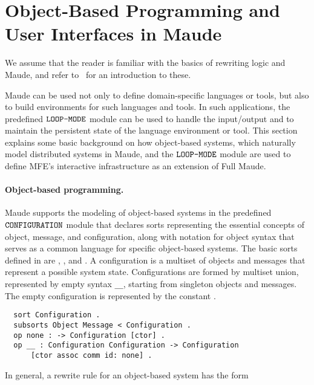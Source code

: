 \section{Object-Based Programming and User Interfaces in Maude}
\label{sec.prelim}

We assume that the reader is familiar with the basics of rewriting
logic and Maude, and refer to~\cite{CDELMMT:2007-book} for 
an introduction to these.

Maude can be used not only to define domain-specific languages
or tools, but also to build environments for such languages and tools.
In such applications, the predefined $\text{\tt LOOP-MODE}$ module can 
be used to handle
the input/output and to maintain the persistent state of the language
environment or tool. This section explains some basic background on how
object-based systems, which naturally model distributed systems in Maude,
and the $\text{\tt LOOP-MODE}$ module are used to define MFE's 
interactive infrastructure as an extension of Full Maude.

\paragraph{\bf Object-based programming.}
Maude supports the modeling of object-based systems in the
predefined $\text{\tt CONFIGURATION}$ module that declares sorts
representing the essential concepts of object, message, and
configuration, along with notation for object syntax that serves
as a common language for specific object-based systems. 
The basic sorts defined in  are ,
, and . A configuration is
a multiset of objects and messages that represent a possible system state.
Configurations are formed by multiset union, represented by empty syntax \verb~__~,
starting from singleton objects and messages.
The empty configuration is represented by the constant . 




\begin{small}
\begin{verbatim}
  sort Configuration .
  subsorts Object Message < Configuration .
  op none : -> Configuration [ctor] .
  op __ : Configuration Configuration -> Configuration
      [ctor assoc comm id: none] .
\end{verbatim}
\end{small}
%
In general, a rewrite rule for an object-based system has the form

